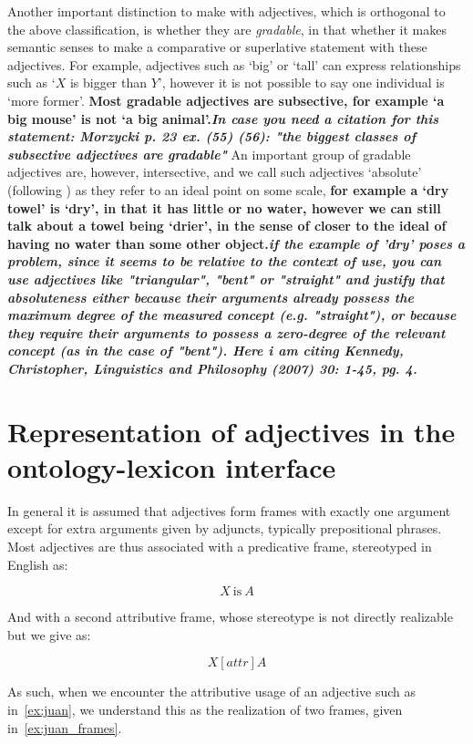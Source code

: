 \documentclass[11pt]{article}
\begin{document}
Another important distinction to make with adjectives, which is orthogonal to the above classification, 
is whether they are \emph{gradable}, in that whether it makes semantic senses to make a comparative 
or superlative statement with these adjectives. For example, adjectives such as 
`big' or `tall' can express relationships such as `$X$ is bigger than $Y$', 
however it is not possible to say one individual is `more former'. \textbf{Most gradable 
adjectives are subsective, for example `a big mouse' is not `a big animal'.\textit{In case you need a citation for this statement: Morzycki p. 23 ex. (55) (56): "the biggest classes of subsective adjectives are gradable"}} 
An important group of gradable adjectives are, however, intersective, and we call 
such adjectives `absolute' (following \cite{rusiecki1985adjectives}) as they 
refer to an ideal point on some scale, \textbf{for example a `dry towel' is `dry', in 
that it has little or no water, however we can still talk about a towel being 
`drier', in the sense of closer to the ideal of having no water than some other 
object.\textit{if the example of 'dry' poses a problem, since it seems to  be relative to the context of use, you can use adjectives like "triangular", "bent" or "straight" and justify that absoluteness either because their arguments already possess the maximum degree of the measured concept (e.g. "straight"), or because they require their arguments to possess a zero-degree of the relevant concept (as in the case of "bent"). Here i am citing Kennedy, Christopher, Linguistics and Philosophy (2007) 30: 1-45, pg. 4.}}


\section{Representation of adjectives in the ontology-lexicon interface}

In general it is assumed that adjectives form frames with exactly one argument 
except for extra arguments given by adjuncts, typically prepositional phrases. 
Most adjectives are thus associated with a predicative frame, stereotyped in 
English as:

$$X\mathrm{~is~}A$$

And with a second attributive frame, whose stereotype is not directly 
realizable but we give as:

$$X [attr] A$$

As such, when we encounter the attributive usage of an adjective such as in~\ref{ex:juan}, 
we understand this as the realization of two frames, given in~\ref{ex:juan_frames}.
\end{document}
